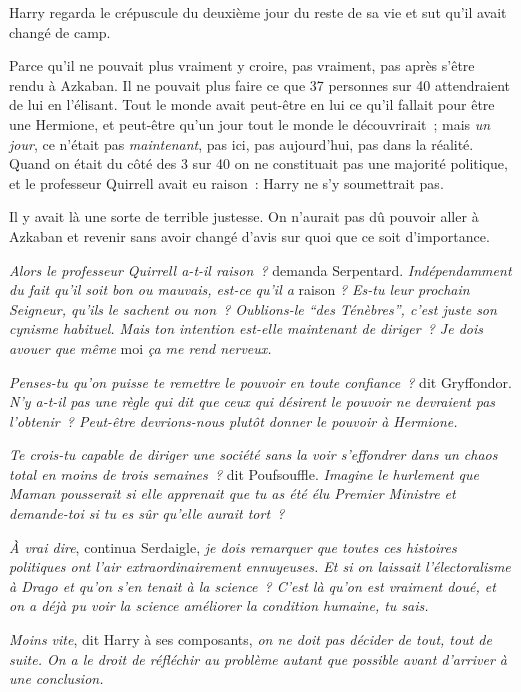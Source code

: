 Harry regarda le crépuscule du deuxième jour du reste de sa vie et sut qu'il avait changé de camp.

Parce qu'il ne pouvait plus vraiment y croire, pas vraiment, pas après s'être rendu à Azkaban.
Il ne pouvait plus faire ce que 37 personnes sur 40 attendraient de lui en l'élisant.
Tout le monde avait peut-être en lui ce qu'il fallait pour être une Hermione, et peut-être qu'un jour tout le monde le découvrirait~; mais \emph{un jour}, ce n'était pas \emph{maintenant}, pas ici, pas aujourd'hui, pas dans la réalité.
Quand on était du côté des 3 sur 40 on ne constituait pas une majorité politique, et le professeur Quirrell avait eu raison~: Harry ne s'y soumettrait pas.

Il y avait là une sorte de terrible justesse.
On n'aurait pas dû pouvoir aller à Azkaban et revenir sans avoir changé d'avis sur quoi que ce soit d'importance.

\emph{Alors le professeur Quirrell a-t-il raison~?} demanda Serpentard.
\emph{Indépendamment du fait qu'il soit bon ou mauvais, est-ce qu'il a} raison \emph{?
Es-tu leur prochain Seigneur, qu'ils le sachent ou non~?
Oublions-le “des Ténèbres”, c'est juste son cynisme habituel.
Mais ton intention est-elle maintenant de diriger~?
Je dois avouer que même} moi \emph{ça me rend nerveux.}

\emph{Penses-tu qu'on puisse te remettre le pouvoir en toute confiance~?} dit Gryffondor.
\emph{N'y a-t-il pas une règle qui dit que ceux qui désirent le pouvoir ne devraient pas l'obtenir~?
Peut-être devrions-nous plutôt donner le pouvoir à Hermione.}

\emph{Te crois-tu capable de diriger une société sans la voir s'effondrer dans un chaos total en moins de trois semaines~?} dit Poufsouffle.
\emph{Imagine le hurlement que Maman pousserait si elle apprenait que tu as été élu Premier Ministre et demande-toi si tu es sûr qu'elle aurait tort~?}

\emph{À vrai dire}, continua Serdaigle, \emph{je dois remarquer que toutes ces histoires politiques ont l'air extraordinairement ennuyeuses.
Et si on laissait l'électoralisme à Drago et qu'on s'en tenait à la science~?
C'est là qu'on est vraiment doué, et on a déjà pu voir la science améliorer la condition humaine, tu sais.}

\emph{Moins vite}, dit Harry à ses composants, \emph{on ne doit pas décider de tout, tout de suite.
On a le droit de réfléchir au problème autant que possible avant d'arriver à une conclusion.}

